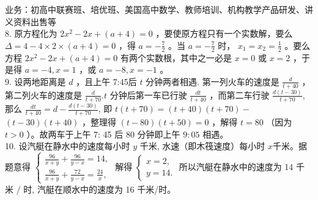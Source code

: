 \documentclass[10pt]{article}
\begin{document}
业务：初高中联赛班、培优班、美国高中数学、教师培训、机构教学产品研发、讲义资料出售等\\
8. 原方程化为 $2 x^{2}-2 x+(a+4)=0$ ，要使原方程只有一个实数解，要么 $\Delta=4-4 \times 2 \times(a+4)=0$ ，得 $a=-\frac{7}{2}$ 。当 $a=-\frac{7}{2}$ 时， $x_{1}=x_{2}=\frac{1}{2}$ 。要么方程 $2 x^{2}-2 x+(a+4)=0$ 有两个实数根，其中之一必是 $x=0$ 或 $x=2$ ，于是得 $a=-4, x=1$ ，或 $a=-8, x=-1$ 。\\
9. 设两地距离是 $d$ ，且上午 7:45后 $t$ 分钟两者相遇. 第一列火车的速度是 $\frac{d}{t+40}$ ，第二列火车的速度是 $\frac{d}{t+70} . t$ 分钟后第一车已行驶 $\frac{d t}{t+40}$ ，而第二车行驶 $\frac{d(t-30)}{t+70}$, 那么 $\frac{d t}{t+40}=d-\frac{d(t-30)}{t+70}$, 即 $t(t+70)=(t+40)(t+70)-$ $(t-30)(t+40)$ ，整理得 $(t-80)(t+50)=0$ ，解得 $t=80$ （因为 $t>0$ ）。故两车于上午 7: 45 后 80 分钟即上午 $9: 05$ 相遇。\\
10. 设汽艇在静水中的速度每小时 $y$ 千米, 水速（即木筏速度）每小时 $x$千米。据题意得 $\left\{\begin{array}{l}\frac{96}{x+y}+\frac{96}{y-x}=14, \\ \frac{96}{x+y}+\frac{72}{y-x}=\frac{24}{x},\end{array}\right.$ 解得 $\left\{\begin{array}{l}x=2, \\ y=14 .\end{array}\right.$ 所以汽艇在静水中的速度为 14 千米 / 时, 汽艇在顺水中的速度为 16 千米/时。
\end{document}
